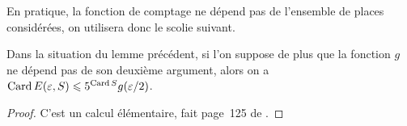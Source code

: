 En pratique, la fonction de comptage ne dépend pas de l'ensemble de places
considérées, on utilisera donc le scolie suivant.

\begin{sco}
  Dans la situation du lemme précédent, si l'on suppose de plus que la
  fonction \( g \) ne dépend pas de son deuxième argument, alors on a
  \( \operatorname{Card} E(\varepsilon, S) \leqslant 5^{\operatorname{Card} S} g(\varepsilon/2) \).
\end{sco}

\begin{proof}
  C'est un calcul élémentaire, fait page~125 de \cite{farhith}.
\end{proof}


\cleardoublepage
\endinput

